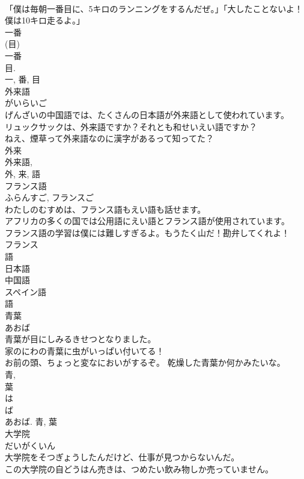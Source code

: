 \documentclass[8pt]{extreport}
\begin{document}
\begin{CJK}{UTF8}{min}
\\	「僕は毎朝一番目に、5キロのランニングをするんだぜ。」「大したことないよ！僕は10キロ走るよ。」	
\\	一番 
\\	(目) 
\\	一番 
\\	目. 
\\	一, 番, 目	
\\	外来語	
\\	がいらいご	
\\	げんざいの中国語では、たくさんの日本語が外来語として使われています。	
\\	リュックサックは、外来語ですか？それとも和せいえい語ですか？	
\\	ねえ、煙草って外来語なのに漢字があるって知ってた？	
\\	外来 
\\	外来語, 
\\	外, 来, 語	
\\	フランス語	
\\	ふらんすご, フランスご	
\\	わたしのむすめは、フランス語もえい語も話せます。	
\\	アフリカの多くの国では公用語にえい語とフランス語が使用されています。	
\\	フランス語の学習は僕には難しすぎるよ。もうたく山だ！勘弁してくれよ！	
\\	フランス 
\\	語 
\\	日本語 
\\	中国語 
\\	スペイン語 
\\	語	
\\	青葉	
\\	あおば	
\\	青葉が目にしみるきせつとなりました。	
\\	家のにわの青葉に虫がいっぱい付いてる！	
\\	お前の頭、ちょっと変なにおいがするぞ。 乾燥した青葉か何かみたいな。	
\\	青, 
\\	葉 
\\	は 
\\	ば 
\\	あおば.	青, 葉	
\\	大学院	
\\	だいがくいん	
\\	大学院をそつぎょうしたんだけど、仕事が見つからないんだ。	
\\	この大学院の自どうはん売きは、つめたい飲み物しか売っていません。	

\end{CJK}
\end{document}
